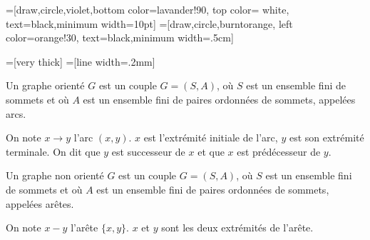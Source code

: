 
\def\lav{lavander!90}
\def\oran{orange!30}

=[draw,circle,violet,bottom color=\lav,
                  top color= white, text=black,minimum width=10pt]
=[draw,circle,burntorange, left color=\oran,
                       text=black,minimum width=.5cm]

                        
=[very thick]   
=[line width=.2mm]   
 



\begin{defi}\cite{ref_01}
Un graphe orienté $G$ est un couple $G=(S,A)$, où $S$ est un ensemble fini de sommets et où $A$ est un ensemble fini de paires ordonnées de sommets, appelées arcs.

On note $x\to y$ l'arc $(x,y)$. $x$ est l'extrémité initiale de l'arc, $y$ est son extrémité terminale. On dit que $y$ est successeur de $x$ et que $x$ est prédécesseur de $y$. 
\end{defi}




\begin{defi}
Un graphe non orienté $G$ est un couple $G=(S,A)$, où $S$ est un ensemble fini de sommets et où $A$ est un ensemble fini de paires ordonnées de sommets, appelées arêtes.

On note $x - y$ l'arête $\{x,y\}$. $x$ et $y$ sont les deux extrémités de l'arête.
\end{defi}


